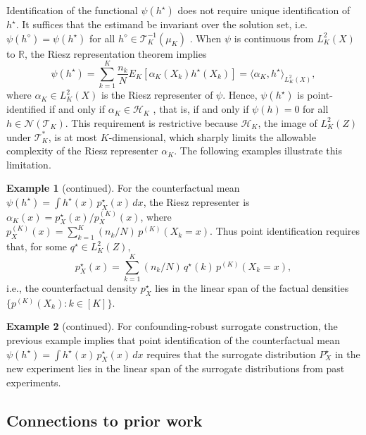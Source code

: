 \documentclass[11pt]{article}
\theoremstyle{plain}
\theoremstyle{definition}
\newtheorem{example}{Example}
\theoremstyle{remark}
\theoremstyle{definition}
\begin{document}
Identification of the functional \(\psi(h^\star)\) does not require unique
identification of \(h^\star\). It suffices that the estimand be invariant over
the solution set, i.e.\ \(\psi(h^\diamond) = \psi(h^\star)\) for all
\(h^\diamond \in \mathcal{T}_K^{-1}(\mu_K)\)
\citep{severini2006some, babii2020completeness, bennett2023inference,
bennett2023source}. When \(\psi\) is continuous from \(L^2_K(X)\) to
\(\mathbb{R}\), the Riesz representation theorem implies
\[
\psi(h^\star)
  = \sum_{k=1}^K \frac{n_k}{N} E_K[\alpha_K(X_k) h^\star(X_k)]
  = \langle \alpha_K, h^\star \rangle_{L^2_K(X)},
\]
where \(\alpha_K \in L^2_K(X)\) is the Riesz representer of \(\psi\).
Hence, \(\psi(h^\star)\) is point-identified if and only if
\(\alpha_K \in \mathcal{H}_K\) \citep{severini2006some}, that is, if and only
if \(\psi(h) = 0\) for all \(h \in \mathcal{N}(\mathcal{T}_K)\).
This requirement is restrictive because \(\mathcal{H}_K\), the image of
\(L^2_K(Z)\) under \(\mathcal{T}_K^*\), is at most \(K\)-dimensional,
which sharply limits the allowable complexity of the Riesz representer
\(\alpha_K\). The following examples illustrate this limitation.

 

 
 
\setcounter{example}{0}
\begin{example}[continued]
For the counterfactual mean 
\(\psi(h^\star)=\int h^\star(x)\,p_X^\star(x)\,dx\), 
the Riesz representer is 
\(\alpha_K(x)=p_X^\star(x)/p_X^{(K)}(x)\), where 
\(p_X^{(K)}(x)=\sum_{k=1}^K (n_k/N)\,p^{(K)}(X_k=x)\).  
Thus point identification requires that, for some \(q^\star\in L^2_K(Z)\),
\[
p_X^\star(x)=\sum_{k=1}^K (n_k/N)\, q^\star(k)\, p^{(K)}(X_k=x),
\]
i.e., the counterfactual density \(p_X^\star\) lies in the linear span of the factual densities \(\{p^{(K)}(X_k):k\in[K]\}\).
\end{example}


 
\setcounter{example}{1}
\begin{example}[continued]
For confounding-robust surrogate construction, the previous example implies
that point identification of the counterfactual mean 
\(\psi(h^\star) = \int h^\star(x)\, p_X^\star(x)\,dx\)
requires that the surrogate distribution \(P_X^\star\) in the new experiment
lies in the linear span of the surrogate distributions from past experiments. 
\end{example}



\subsection{Connections to prior work}
\label{sec::relatedworkident}
\end{document}

